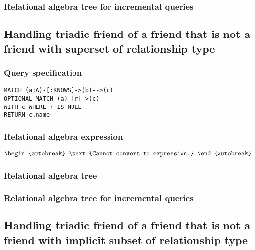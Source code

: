 
\subsubsection*{Relational algebra tree for incremental queries}


\subsection{Handling triadic friend of a friend that is not a friend with superset of relationship type}

\subsubsection*{Query specification}

\begin{lstlisting}
MATCH (a:A)-[:KNOWS]->(b)-->(c)
OPTIONAL MATCH (a)-[r]->(c)
WITH c WHERE r IS NULL
RETURN c.name
\end{lstlisting}

\subsubsection*{Relational algebra expression}

\begin{align*}
\begin{autobreak}
\text{Cannot convert to expression.}
\end{autobreak}
\end{align*}

\subsubsection*{Relational algebra tree}


\subsubsection*{Relational algebra tree for incremental queries}


\subsection{Handling triadic friend of a friend that is not a friend with implicit subset of relationship type}

